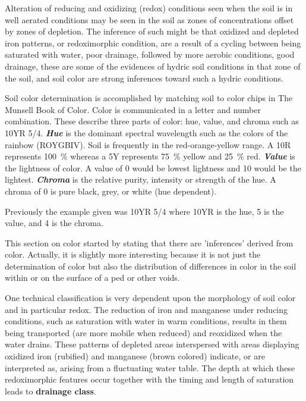 \documentclass[letterpaper, 12pt]{article}
\begin{document}
Alteration of reducing and oxidizing (redox) conditions seen when the soil is in well aerated conditions may be seen in the soil as zones of concentrations offset by zones of depletion. The inference of such might be that oxidized and depleted iron patterns, or redoximorphic condition, are a result of a cycling between being saturated with water, poor drainage, followed by more aerobic conditions, good drainage, these are some of the evidences of hydric soil conditions in that zone of the soil, and soil color are strong inferences toward such a hydric conditions.
    
Soil color determination is accomplished by matching soil to color chips in The Munsell Book of Color. Color is communicated in a letter and number combination. These describe three parts of color: hue, value, and chroma such as 10YR 5/4. \textbf{\textit{Hue}} is the dominant spectral wavelength such as the colors of the rainbow (ROYGBIV). Soil is frequently in the red-orange-yellow range. A 10R represents \qty{100}{\percent} whereas a 5Y represents \qty{75}{\percent} yellow and \qty{25}{\percent} red. \textbf{\textit{Value}} is the lightness of color. A value of 0 would be lowest lightness and 10 would be the lightest. \textbf{\textit{Chroma}} is the relative purity, intensity or strength of the hue. A chroma of 0 is pure black, grey, or white (hue dependent).

Previously the example given was 10YR 5/4 where 10YR is the hue, 5 is the value, and 4 is the chroma.
    
This section on color started by stating that there are 'inferences' derived from color. Actually, it is slightly more interesting because it is not just the determination of color but also the distribution of differences in color in the soil  within or on the surface of a ped or other voids.
 
One technical classification is very dependent upon the morphology of soil color and in particular redox. The reduction of iron and manganese under reducing conditions, such as saturation with water in warm conditions, results in them being  transported (are more mobile when reduced) and reoxidized when the water drains. These patterns of depleted areas interspersed with areas displaying oxidized iron (rubified) and manganese (brown colored) indicate, or are interpreted as, arising from a fluctuating water table. The depth at which these redoximorphic features occur together with the timing and length of saturation leads to \textbf{drainage class}.
 
\end{document}
